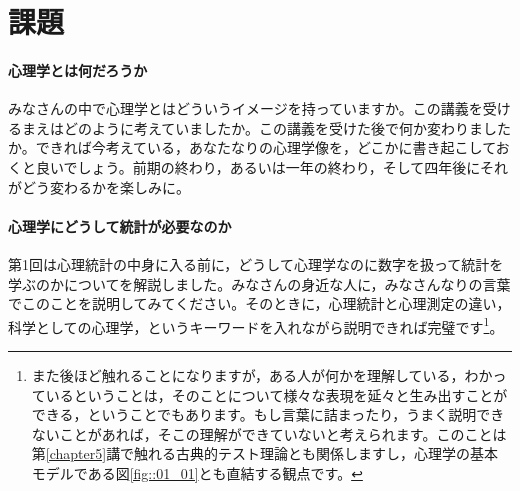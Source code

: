 \documentclass{ltjsbook}
\begin{document}
\section{課題}
\paragraph{心理学とは何だろうか}
みなさんの中で心理学とはどういうイメージを持っていますか。この講義を受けるまえはどのように考えていましたか。この講義を受けた後で何か変わりましたか。できれば今考えている，あなたなりの心理学像を，どこかに書き起こしておくと良いでしょう。前期の終わり，あるいは一年の終わり，そして四年後にそれがどう変わるかを楽しみに。
\paragraph{心理学にどうして統計が必要なのか}
第1回は心理統計の中身に入る前に，どうして心理学なのに数字を扱って統計を学ぶのかについてを解説しました。みなさんの身近な人に，みなさんなりの言葉でこのことを説明してみてください。そのときに，心理統計と心理測定の違い，科学としての心理学，というキーワードを入れながら説明できれば完璧です\footnote{また後ほど触れることになりますが，ある人が何かを理解している，わかっているということは，そのことについて様々な表現を延々と生み出すことができる，ということでもあります。もし言葉に詰まったり，うまく説明できないことがあれば，そこの理解ができていないと考えられます。このことは第\ref{chapter5}講で触れる古典的テスト理論とも関係しますし，心理学の基本モデルである図\ref{fig::01_01}とも直結する観点です。}。
\end{document}
